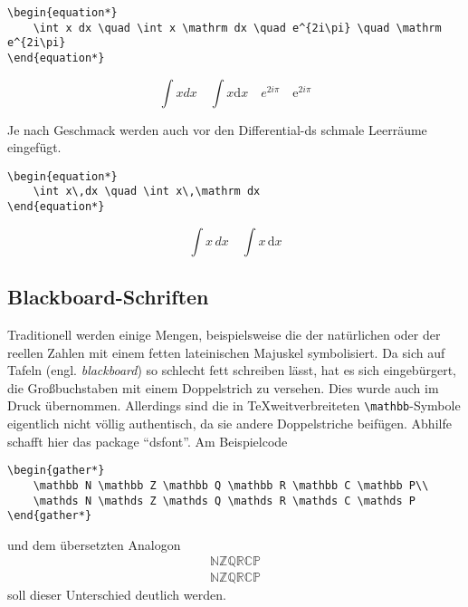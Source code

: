 \begin{lstlisting}
\begin{equation*}
	\int x dx \quad \int x \mathrm dx \quad e^{2i\pi} \quad \mathrm e^{2i\pi}
\end{equation*}
\end{lstlisting}

\begin{equation*}
	\int x dx \quad \int x \mathrm dx \quad e^{2i\pi} \quad \mathrm e^{2i\pi}
\end{equation*}

Je nach Geschmack werden auch vor den Differential-ds schmale Leerräume eingefügt.

\begin{lstlisting}
\begin{equation*}
	\int x\,dx \quad \int x\,\mathrm dx
\end{equation*}
\end{lstlisting}

\begin{equation*}
	\int x\,dx \quad \int x\,\mathrm dx
\end{equation*}

\subsection{Blackboard-Schriften}
Traditionell werden einige Mengen, beispielsweise die der natürlichen oder der reellen Zahlen mit einem fetten lateinischen Majuskel symbolisiert. Da sich auf Tafeln (engl. \emph{blackboard}) so schlecht fett schreiben lässt, hat es sich eingebürgert, die Großbuchstaben mit einem Doppelstrich zu versehen. Dies wurde auch im Druck übernommen. Allerdings sind die in \TeX weitverbreiteten \verb|\mathbb|-Symbole eigentlich nicht völlig authentisch, da sie andere Doppelstriche beifügen. Abhilfe schafft hier das package \enquote{dsfont}. Am Beispielcode
\begin{lstlisting}
\begin{gather*}
	\mathbb N \mathbb Z \mathbb Q \mathbb R \mathbb C \mathbb P\\
	\mathds N \mathds Z \mathds Q \mathds R \mathds C \mathds P
\end{gather*}
\end{lstlisting}
und dem übersetzten Analogon
\begin{gather*}
	\mathbb N \mathbb Z \mathbb Q \mathbb R \mathbb C \mathbb P\\
	\mathds N \mathds Z \mathds Q \mathds R \mathds C \mathds P
\end{gather*}
soll dieser Unterschied deutlich werden.

